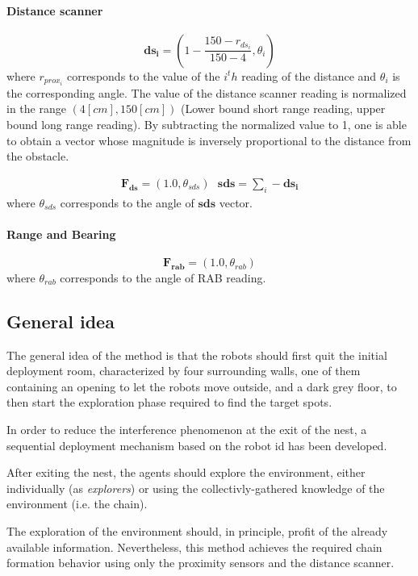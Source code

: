 \paragraph{Distance scanner}
\begin{equation}
\mathbf{ds_i} = (1 - \frac{150 - r_{ds_{i}}}{150-4},\theta_i)  
\end{equation}
where $r_{prox_i}$ corresponds to the value of the $i^th$ reading of the distance and $\theta_i$ is the corresponding angle.
The value of the distance scanner reading is normalized in the range $(4[cm],150[cm])$ 
(Lower bound short range reading, upper bound long range reading).
By subtracting the normalized value to 1, one is able to obtain a vector whose 
magnitude is inversely proportional to the distance from the obstacle.

\begin{align}
\mathbf{F_{ds}} = (1.0,\theta_{sds}) \text{    }\mathbf{sds} = \sum_i -\mathbf{ds_i} 
\end{align}
where $\theta_{sds}$ corresponds to the angle of $\mathbf{sds}$ vector.

\paragraph{Range and Bearing}
\begin{equation}
\mathbf{F_{rab}} = (1.0,\theta_{rab})  
\end{equation}
where $\theta_{rab}$ corresponds to the angle of RAB reading.

\subsection{General idea}
The general idea of the method is that the robots should first quit the initial deployment room, characterized by four surrounding walls, one of them containing an opening to let the robots move outside, and a dark grey floor, to then start the exploration phase required to find the target spots.

In order to reduce the interference phenomenon at the exit of the nest, a sequential deployment mechanism based on the robot id has been developed.

After exiting the nest, the agents should explore the environment, either individually (as \emph{explorers}) or using the collectivly-gathered knowledge of the environment (i.e. the chain).

The exploration of the environment should, in principle, profit of the already available information.
Nevertheless, this method achieves the required chain formation behavior using only the proximity sensors and the distance scanner.

